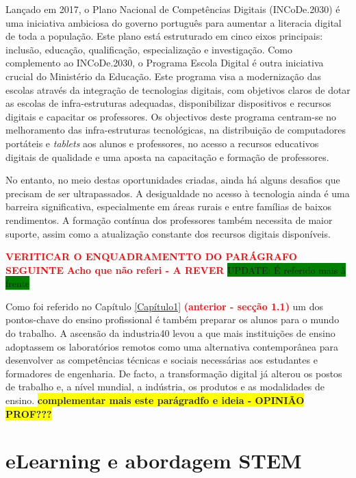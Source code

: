 Lançado em 2017, o Plano Nacional de Competências Digitais (INCoDe.2030)\cite{incode2030} é uma iniciativa ambiciosa do governo português para aumentar a literacia digital de toda a população. Este plano está estruturado em cinco eixos principais: inclusão, educação, qualificação, especialização e investigação. 
Como complemento ao INCoDe.2030, o Programa Escola Digital é outra iniciativa crucial do Ministério da Educação. Este programa visa a modernização das escolas através da integração de tecnologias digitais, com objetivos claros de dotar as escolas de infra-estruturas adequadas, disponibilizar dispositivos e recursos digitais e capacitar os professores. \cite{escoladigital} Os objectivos deste programa centram-se no melhoramento das infra-estruturas tecnológicas, na distribuição de computadores portáteis e \textit{tablets} aos alunos e professores, no acesso a recursos educativos digitais de qualidade e uma aposta na capacitação e formação de professores.

No entanto, no meio destas oportunidades criadas, ainda há alguns desafios que precisam de ser ultrapassados. A desigualdade no acesso à tecnologia ainda é uma barreira significativa, especialmente em áreas rurais e entre famílias de baixos rendimentos. A formação contínua dos professores também necessita de maior suporte, assim como a atualização constante dos recursos digitais disponíveis.

\textcolor{red}{\textbf{VERITICAR O ENQUADRAMENTTO DO PARÁGRAFO SEGUINTE}}
\textcolor{red}{\textbf{Acho que não referi - A REVER}}
\colorbox{green}{UPDATE: É referido mais à frente}

Como foi referido no Capítulo \ref{Capítulo1} \textbf{\textcolor{red}{(anterior - secção 1.1)}} um dos pontos-chave do ensino profissional é também preparar os alunos para o mundo do trabalho. A ascensão da \gls{industria40} levou a que mais instituições de ensino adoptassem os laboratórios remotos como uma alternativa contemporânea para desenvolver as competências técnicas e sociais necessárias aos estudantes e formadores de engenharia\cite{EvaluationRemoteVirtualE-Learning}. De facto, a transformação digital já alterou os postos de trabalho e, a nível mundial, a indústria, os produtos e as modalidades de ensino.
\colorbox{yellow}{\textbf{complementar mais este parágradfo e ideia - OPINIÃO PROF???}}


\section{eLearning e abordagem STEM} %
\label{sec:elearningstem}	%

